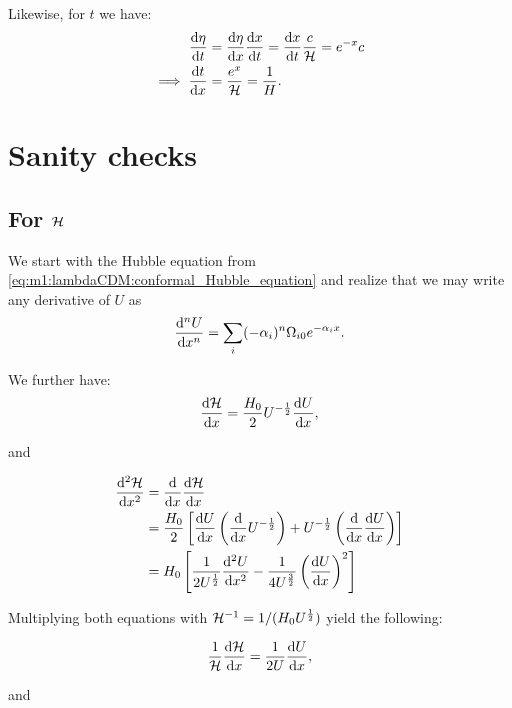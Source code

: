     Likewise, for $t$ we have:
    \begin{equation}
        \begin{split}
            \dv{\eta}{t} &= \dv{\eta}{x}\dv{x}{t} = \dv{x}{t}\frac{c}{\mathcal{H}} = e^{-x}c\\
            \implies \dv{t}{x} &= \frac{e^x}{\mathcal{H}} = \frac{1}{H}.
        \end{split}
    \end{equation}


\section{Sanity checks}\label{app:sanity}
\subsection{For $\mathcal{H}$}
    We start with the Hubble equation from \cref{eq:m1:lambdaCDM:conformal_Hubble_equation} and realize that we may write any derivative of $U$ as
    \begin{equation}
        \dv[n]{U}{x} = \sum_i(-\alpha_i)^n\Omega_{i0}e^{-\alpha_ix}.
    \end{equation}

    We further have:
    \begin{equation}
        \dv{\mathcal{H}}{x} = \frac{H_0}{2}U^{-\frac{1}{2}}\dv{U}{x},
    \end{equation}

    and
    
    \begin{equation}
        \begin{split}
            \dv[2]{\mathcal{H}}{x} &= \dv{}{x}\dv{\mathcal{H}}{x}\\
            &= \frac{H_0}{2}\left[\dv{U}{x}\left(\dv{}{x}U^{-\frac{1}{2}}\right) + U^{-\frac{1}{2}}\left(\dv{}{x}\dv{U}{x}\right)\right]\\
            &=H_0\left[\frac{1}{2U^{\frac{1}{2}}}\dv[2]{U}{x} - \frac{1}{4U^{\frac{3}{2}}}\left(\dv{U}{x}\right)^2\right]
        \end{split}
    \end{equation}


    Multiplying both equations with $\mathcal{H}^{-1} = 1/(H_0U^{\frac{1}{2}})$ yield the following:

    \begin{equation}
        \frac{1}{\mathcal{H}}\dv{\mathcal{H}}{x} = \frac{1}{2U}\dv{U}{x},
    \end{equation}

    and 

